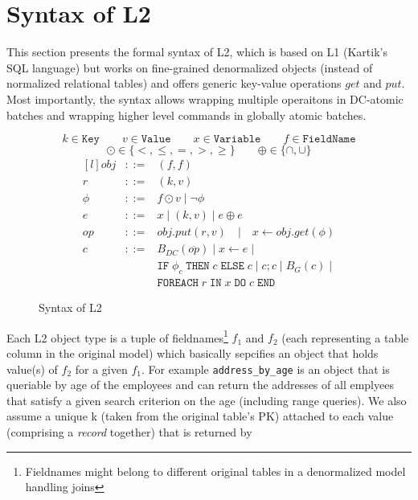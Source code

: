 \documentclass[12pt,letter]{article}
\begin{document}
\section{Syntax of L2}
This section presents the formal syntax of L2, which is based on L1
(Kartik's SQL language) but works on fine-grained denormalized objects (instead
of normalized relational tables) and offers generic key-value operations
$get$ and $put$. Most importantly, the syntax allows wrapping multiple
operaitons in DC-atomic batches and wrapping higher level commands in
globally atomic batches.


\begin{figure}[h]
	$$ k \in \texttt{Key}  \qquad  v \in \texttt{Value}  \qquad x \in \texttt{Variable} \qquad 
 	f \in \texttt{FieldName}  $$
	$$ \odot \in \{<,\leq,=,>,\geq\} \qquad \oplus \in \{\cap,\cup\}$$
	$$
	\begin{matrix*}[l]
        	obj &  ::= & (f,f) \\
        	r &  ::= & (k,v) \\
		\phi  & ::= & f \odot v \;|\; \neg
		\phi \\
		e  & ::= & x \;|\; (k,v) \;|\; e \oplus e\\
		op   & ::= & obj.put(r,v) \quad
		|\quad x\leftarrow obj.get(\phi)  \\
		c   & ::=  &  B_{DC}(\overline{op})
		\;|\; x\leftarrow e \;|\;
		\\  & & \texttt{IF}\; \phi_c \;\texttt{THEN} \;c \;\texttt{ELSE}\; c \;|\;  c;c \;|\;
	        B_{G}(c) \;|\;
		\\  & & \texttt{FOREACH}\; r \;\texttt{IN} \; x \; \texttt{DO}\; c \;\texttt{END}
		
	\end{matrix*}
	$$
\caption{Syntax of L2}
\end{figure}
Each L2 object type is a tuple of fieldnames\footnote{Fieldnames might belong to 
different original tables in a denormalized model handling joins}
$f_1$ and $f_2$ (each representing a table column in
the original model) which basically sepcifies an object that holds value(s) of
$f_2$ for a given $f_1$.
For example \texttt{address\_by\_age} is an
object that is queriable by age of the employees and can return the
addresses of all emplyees that satisfy a given search criterion on the
age (including range queries). We also assume a unique k (taken from the
original table's PK) attached to
each value (comprising a \emph{record} together) that is returned by
\end{document}
